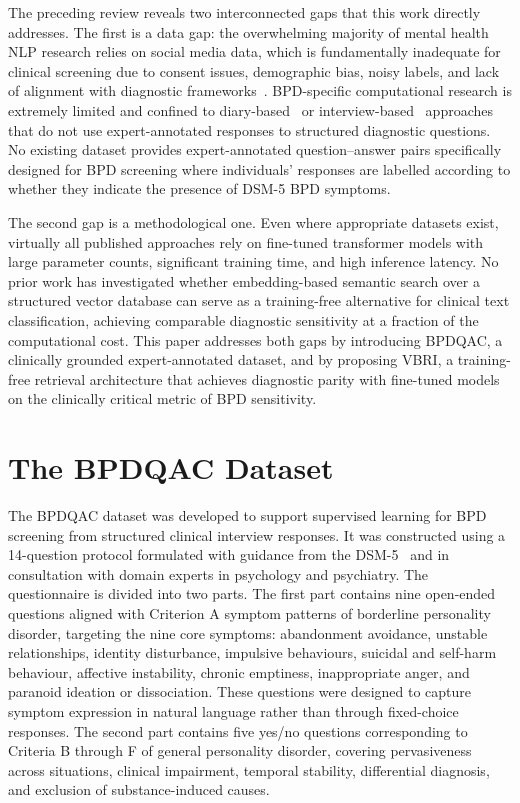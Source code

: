 \documentclass[11pt]{article}
\newcommand{\vbri}{VBRI}
\newcommand{\bpdqac}{BPDQAC}
\newcommand{\dsmv}{DSM-5}
\begin{document}
The preceding review reveals two interconnected gaps that this work directly addresses. The first
is a data gap: the overwhelming majority of mental health NLP research relies on social media
data, which is fundamentally inadequate for clinical screening due to consent issues, demographic
bias, noisy labels, and lack of alignment with diagnostic frameworks~\cite{zhang2022natural}.
BPD-specific computational research is extremely limited and confined to
diary-based~\cite{khazbak2021mindtime} or interview-based~\cite{wang2020learning} approaches
that do not use expert-annotated responses to structured diagnostic questions. No existing
dataset provides expert-annotated question--answer pairs specifically designed for BPD screening
where individuals' responses are labelled according to whether they indicate the presence of
\dsmv{} BPD symptoms.

The second gap is a methodological one. Even where appropriate datasets exist, virtually all
published approaches rely on fine-tuned transformer models with large parameter counts,
significant training time, and high inference latency. No prior work has investigated whether
embedding-based semantic search over a structured vector database can serve as a training-free
alternative for clinical text classification, achieving comparable diagnostic sensitivity at a
fraction of the computational cost. This paper addresses both gaps by introducing \bpdqac{}, a
clinically grounded expert-annotated dataset, and by proposing \vbri{}, a training-free retrieval
architecture that achieves diagnostic parity with fine-tuned models on the clinically critical
metric of BPD sensitivity.

\section{The BPDQAC Dataset}\label{sec:dataset}

The \bpdqac{} dataset was developed to support supervised learning for BPD screening from
structured clinical interview responses. It was constructed using a 14-question protocol
formulated with guidance from the \dsmv~\cite{dsm} and in consultation with domain experts in
psychology and psychiatry. The questionnaire is divided into two parts. The first part contains
nine open-ended questions aligned with Criterion A symptom patterns of borderline personality
disorder, targeting the nine core symptoms: abandonment avoidance, unstable relationships,
identity disturbance, impulsive behaviours, suicidal and self-harm behaviour, affective
instability, chronic emptiness, inappropriate anger, and paranoid ideation or dissociation.
These questions were designed to capture symptom expression in natural language rather than
through fixed-choice responses. The second part contains five yes/no questions corresponding to
Criteria B through F of general personality disorder, covering pervasiveness across situations,
clinical impairment, temporal stability, differential diagnosis, and exclusion of
substance-induced causes.
\end{document}
